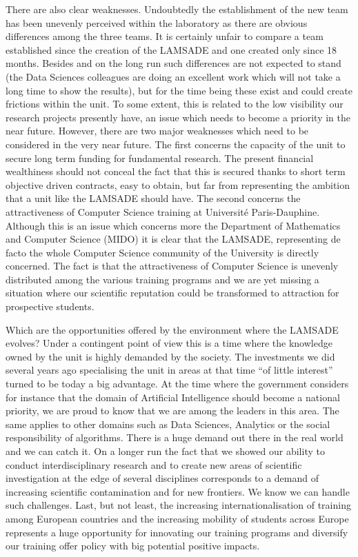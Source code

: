 There are also clear weaknesses. Undoubtedly the establishment of the new team has been unevenly perceived within the laboratory as there are obvious differences among the three teams. It is certainly unfair to compare a team established since the creation of the LAMSADE and one created only since 18 months. Besides and on the long run such differences are not expected to stand (the Data Sciences colleagues are doing an excellent work which will not take a long time to show the results), but for the time being these exist and could create frictions within the unit. To some extent, this is related to the low visibility our research projects presently have, an issue which needs to become a priority in the near future. However, there are two major weaknesses which need to be considered in the very near future. The first concerns the capacity of the unit to secure long term funding for fundamental research. The present financial wealthiness should not conceal the fact that this is secured thanks to short term objective driven contracts, easy to obtain, but far from representing the ambition that a unit like the LAMSADE should have. The second concerns the attractiveness of Computer Science training at Université Paris-Dauphine. Although this is an issue which concerns more the Department of Mathematics and Computer Science (MIDO) it is clear that the LAMSADE, representing de facto the whole Computer Science community of the University is directly concerned. The fact is that the attractiveness of Computer Science is unevenly distributed among the various training programs and we are yet missing a situation where our scientific reputation could be transformed to attraction for prospective students.

Which are the opportunities offered by the environment where the LAMSADE evolves? Under a contingent point of view this is a time where the knowledge owned by the unit is highly demanded by the society. The investments we did several years ago specialising the unit in areas at that time ``of little interest'' turned to be today a big advantage. At the time where the government considers for instance that the domain of Artificial Intelligence should become a national priority, we are proud to know that we are among the leaders in this area. The same applies to other domains such as Data Sciences, Analytics or the social responsibility of algorithms. There is a huge demand out there in the real world and we can catch it. On a longer run the fact that we showed our ability to conduct interdisciplinary research and to create new areas of scientific investigation at the edge of several disciplines corresponds to a demand of increasing scientific contamination and for new frontiers. We know we can handle such challenges. Last, but not least, the increasing internationalisation of training among European countries and the increasing mobility of students across Europe represents a huge opportunity for innovating our training programs and diversify our training offer policy with big potential positive impacts.

